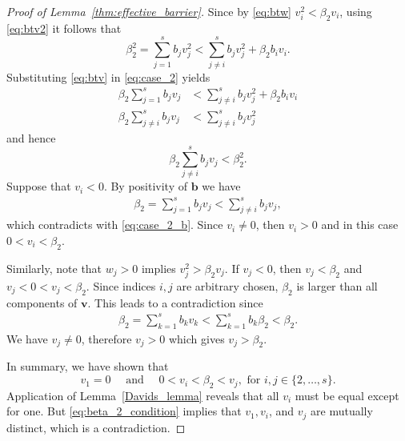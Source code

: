 \begin{proof}[Proof of Lemma~\ref{thm:effective_barrier}]
    Since by \eqref{eq:btw} $v_i^2 < \beta_2 v_i$, using \eqref{eq:btv2} it follows that
    \begin{equation}\label{eq:case_2}
    		\beta_2^2 = \sum_{j=1}^s b_j v_j^2 < \sum_{j \neq i}^s b_j v_j^2 + \beta_2 b_i v_i.
    	\end{equation}
    	Substituting \eqref{eq:btv} in \eqref{eq:case_2} yields
    	\begin{align*}
    		\beta_2\sum_{j=1}^s b_j v_j &< \sum_{j \neq i}^s b_j v_j^2 + \beta_2 b_i v_i \\
    		\beta_2\sum_{j \neq i}^s b_j v_j &< \sum_{j \neq i}^s b_j v_j^2 
    	\end{align*}
    	and hence
    	\begin{equation}\label{eq:case_2_b}
            \beta_2\sum_{j \neq i}^s b_j v_j < \beta_2^2.
    \end{equation}
    Suppose that $v_{i} < 0$. By positivity of $\bm{b}$ we have
    \begin{align*}
    		\beta_2 = \sum_{j=1}^s b_j v_j < \sum_{j \neq i}^s b_j v_j,
    	\end{align*}
    	which contradicts with \eqref{eq:case_2_b}. 
    	Since $v_i \neq 0$, then $v_i > 0$ and in this case $0 < v_i < \beta_2$.
    	
    	Similarly, note that $w_j > 0$ implies $v_j^2 > \beta_2 v_j$. 
    	If $v_j < 0$, then $v_j < \beta_2$ and $v_j < 0 < v_j < \beta_2$. 
    	Since indices $i, j$ are arbitrary chosen, $\beta_2$ is larger than all 
    	components of $\bm{v}$. 
    	This leads to a contradiction since
    	\begin{align*}
    		\beta_2 = \sum_{k=1}^s b_k v_k < \sum_{k=1}^s b_k\beta_2 < \beta_2.
    	\end{align*}
    	We have $v_j \neq 0$, therefore $v_j > 0$ which gives $v_j > \beta_2$.
    	
    	In summary, we have shown that
    	\begin{equation}\label{eq:beta_2_condition}
    		v_1 = 0 \quad \text{ and } \quad 0 < v_i < \beta_2 < v_j, \text{ for } i, j \in \{2, \dots, s\}.
    \end{equation}
    Application of Lemma~\ref{Davids_lemma} reveals that all $v_i$ must
    be equal except for one.
    But \eqref{eq:beta_2_condition} implies that $v_1, v_i$, and $v_j$ are
    mutually distinct, which is a contradiction.
\end{proof}
